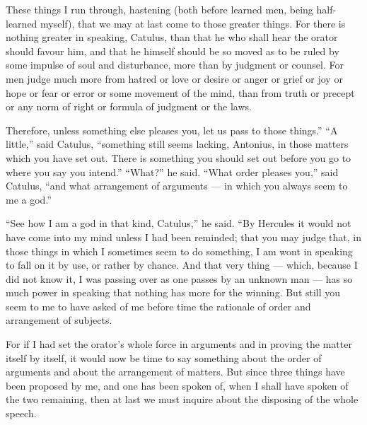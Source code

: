  These things I run through, hastening (both before learned men, being half-learned myself), that we may at last come to those greater things. For there is nothing greater in speaking, Catulus, than that he who shall hear the orator should favour him, and that he himself should be so moved as to be ruled by some impulse of soul and disturbance, more than by judgment or counsel. For men judge much more from hatred or love or desire or anger or grief or joy or hope or fear or error or some movement of the mind, than from truth or precept or any norm of right or formula of judgment or the laws.

 Therefore, unless something else pleases you, let us pass to those things.'' ``A little,'' said Catulus, ``something still seems lacking, Antonius, in those matters which you have set out. There is something you should set out before you go to where you say you intend.'' ``What?'' he said. ``What order pleases you,'' said Catulus, ``and what arrangement of arguments — in which you always seem to me a god.''

 ``See how I am a god in that kind, Catulus,'' he said. ``By Hercules it would not have come into my mind unless I had been reminded; that you may judge that, in those things in which I sometimes seem to do something, I am wont in speaking to fall on it by use, or rather by chance. And that very thing — which, because I did not know it, I was passing over as one passes by an unknown man — has so much power in speaking that nothing has more for the winning. But still you seem to me to have asked of me before time the rationale of order and arrangement of subjects.

 For if I had set the orator's whole force in arguments and in proving the matter itself by itself, it would now be time to say something about the order of arguments and about the arrangement of matters. But since three things have been proposed by me, and one has been spoken of, when I shall have spoken of the two remaining, then at last we must inquire about the disposing of the whole speech.

